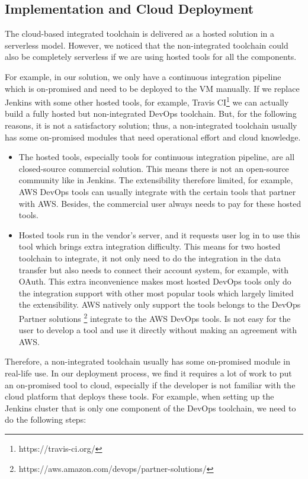 \subsection{Implementation and Cloud Deployment}
The cloud-based integrated toolchain is delivered as a hosted solution in a serverless model. However, we noticed that the non-integrated toolchain could also be completely serverless if we are using hosted tools for all the components. 
\par
For example, in our solution, we only have a continuous integration pipeline which is on-promised and need to be deployed to the VM manually. If we replace Jenkins with some other hosted tools, for example, Travis CI\footnote{https://travis-ci.org/} we can actually build a fully hosted but non-integrated DevOps toolchain. But, for the following reasons, it is not a satisfactory solution; thus, a non-integrated toolchain usually has some on-promised modules that need operational effort and cloud knowledge.
\begin{itemize}
 \item The hosted tools, especially tools for continuous integration pipeline, are all closed-source commercial solution. This means there is not an open-source community like in Jenkins. The extensibility therefore limited, for example, AWS DevOps tools can usually integrate with the certain tools that partner with AWS. Besides, the commercial user always needs to pay for these hosted tools.
 \item Hosted tools run in the vendor's server, and it requests user log in to use this tool which brings extra integration difficulty. This means for two hosted toolchain to integrate, it not only need to do the integration in the data transfer but also needs to connect their account system, for example, with OAuth. This extra inconvenience makes most hosted DevOps tools only do the integration support with other most popular tools which largely limited the extensibility. AWS natively only support the tools belongs to the DevOps Partner solutions \footnote{https://aws.amazon.com/devops/partner-solutions/} integrate to the AWS DevOps tools. Is not easy for the user to develop a tool and use it directly without making an agreement with AWS.
\end{itemize}
Therefore, a non-integrated toolchain usually has some on-promised module in real-life use. In our deployment process, we find it requires a lot of work to put an on-promised tool to cloud, especially if the developer is not familiar with the cloud platform that deploys these tools. For example, when setting up the Jenkins cluster that is only one component of the DevOps toolchain, we need to do the following steps:
